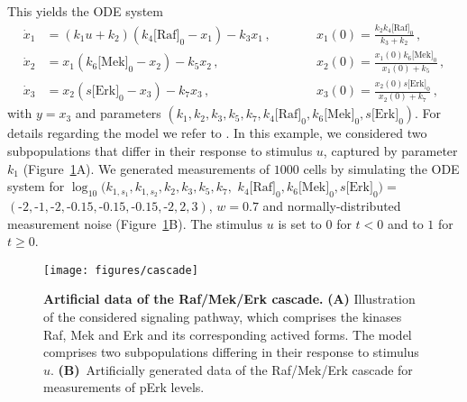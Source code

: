 \documentclass{llncs}
\begin{document}
This yields the ODE system
\begin{align*}
\dot{x}_1 &= (k_1u+k_2)(k_4\big[ \text{Raf}  \big]_0-x_1)-k_3x_1\,,\qquad &&x_1(0) =\frac{k_2k_4\big[ \text{Raf}  \big]_0}{k_3+k_2} \,,\\
\dot{x}_2 &= x_1(k_6\big[ \text{Mek}  \big]_0-x_2)-k_5x_2\,,\qquad&& x_2(0) = \frac{x_1(0)k_6\big[ \text{Mek}  \big]_0}{x_1(0) + k_5}\,,\\
\dot{x}_3 &= x_2(s\big[ \text{Erk}  \big]_0-x_3)-k_7x_3\,,\qquad &&x_3(0) =\frac{x_2(0)s\big[ \text{Erk}  \big]_0}{x_2(0)+k_7} \,,
\end{align*}
with $y = x_3$ and parameters $(k_1,k_2,k_3,k_5,k_7,k_4\big[ \text{Raf}  \big]_0,k_6\big[ \text{Mek}  \big]_0,s\big[ \text{Erk}  \big]_0)$. For details regarding the model we refer to \cite{Hasenauer2014}. In this example, we considered two subpopulations that differ in their response to stimulus $u$, captured by parameter $k_1$ (Figure~\ref{fig:cascade}A). We generated measurements of $1000$ cells by simulating the ODE system for $\log_{10}(k_{1,s_1},k_{1,s_2},k_2,k_3,k_5,k_7,$ $k_4\big[ \text{Raf}  \big]_0,k_6\big[ \text{Mek}  \big]_0,s\big[ \text{Erk}  \big]_0)= $ $(\textrm{-}2,\textrm{-}1,\textrm{-}2,\textrm{-}0.15,\textrm{-}0.15,\textrm{-}0.15,\textrm{-}2,2,3)$, $w = 0.7$ and normally-distributed measurement noise (Figure~\ref{fig:cascade}B). The stimulus $u $ is set to $0$ for $t<0$ and to $1$ for $t\geq0$. 
\begin{figure}[tb]
\centering
\texttt{[image: figures/cascade]}
\caption{\color{revcol}\textbf{Artificial data of the Raf/Mek/Erk cascade.} \textbf{(A)} Illustration of the considered signaling pathway, which comprises the kinases Raf, Mek and Erk and its corresponding actived forms. The model comprises two subpopulations differing in their response to stimulus $u$. \textbf{(B)}~Artificially generated data of the Raf/Mek/Erk cascade for measurements of pErk levels. }\label{fig:cascade}
\end{figure}
\end{document}
